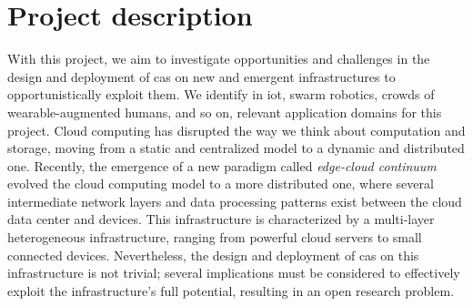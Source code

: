 \documentclass[12pt]{article}
\begin{document}

\section{Project description}\label{sec:project-description}

With this project,
we aim to investigate opportunities and challenges in the design and deployment of
\ac{cas} on new and emergent infrastructures to opportunistically exploit them.
%
We identify in \ac{iot}, swarm robotics, crowds of wearable-augmented humans, and so on,
relevant application domains for this project.
%
Cloud computing has disrupted the way we think about computation and storage,
moving from a static and centralized model to a dynamic and distributed one.
%
Recently,
the emergence of a new paradigm called \emph{edge-cloud continuum}~\cite{DBLP:journals/iot/BittencourtISFM18}
evolved the cloud computing model to a more distributed one,
where several intermediate network layers and data processing patterns exist between the cloud data center and devices.
%
This infrastructure is characterized by a multi-layer heterogeneous infrastructure,
ranging from powerful cloud servers to small connected devices.
%
Nevertheless,
the design and deployment of \ac{cas} on this infrastructure is not trivial;
several implications must be considered to effectively exploit the infrastructure's full potential,
resulting in an open research problem.
\end{document}
